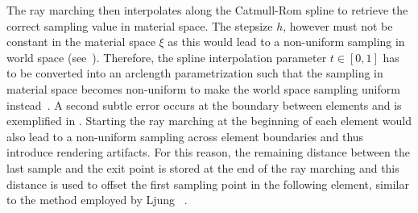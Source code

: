 The ray marching then interpolates along the Catmull-Rom spline to retrieve the correct sampling value in material space.  The stepsize $h$, however must not be constant in the material space $\xi$ as this would lead to a non-uniform sampling in world space (see~). Therefore, the spline interpolation parameter $t \in [0,1]$ has to be converted into an arclength parametrization such that the sampling in material space becomes non-uniform to make the world space sampling uniform instead~\cite{guenter90arclength}.  A second subtle error occurs at the boundary between elements and is exemplified in .  Starting the ray marching at the beginning of each element would also lead to a non-uniform sampling across element boundaries and thus introduce rendering artifacts.  For this reason, the remaining distance between the last sample and the exit point is stored at the end of the ray marching and this distance is used to offset the first sampling point in the following element, similar to the method employed by Ljung \etal~\cite{ljung2006adaptive}.


